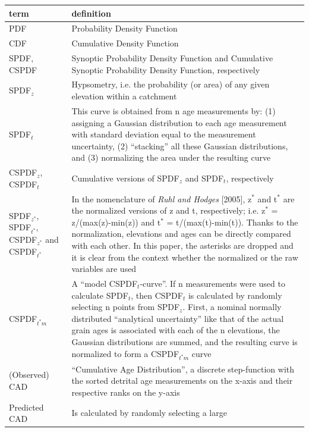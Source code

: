 \documentclass[12pt,twoside]{article}
\begin{document}
\begin{table}[here]
  \centering
\begin{footnotesize}
  \begin{tabular}[]{|p{}|p{}|}
\hline
term & definition \\
\hline\hline
PDF & Probability Density Function\\
\hline
CDF & Cumulative Density Function\\
\hline
SPDF,  CSPDF &  Synoptic   Probability  Density   Function  and
  Cumulative Synoptic Probability Density Function, respectively\\
\hline
SPDF$_{z}$ &  Hypsometry, i.e. the  probability (or area)  of any
  given elevation within a catchment\\
\hline
SPDF$_{t}$ & This curve is obtained from n age measurements by:
(1) assigning a Gaussian distribution to each age measurement with
    standard deviation equal to the measurement uncertainty,
(2) ``stacking'' all these Gaussian distributions, and
(3) normalizing the area under the resulting curve\\
\hline
CSPDF$_{z}$, CSPDF$_{t}$ &  Cumulative versions of SPDF$_{z}$ and
  SPDF$_{t}$, respectively\\
\hline
SPDF$_{z^*}$, SPDF$_{t^*}$,  CSPDF$_{z^*}$ and CSPDF$_{t^*}$ & In
  the nomenclature of {\it Ruhl and  Hodges} [2005], z$^*$ and t$^*$ are the
  normalized  versions  of  z  and  t,  respectively;  i.e.   z$^*$  =
  z/(max(z)-min(z))  and  t$^*$ =  t/(max(t)-min(t)).   Thanks to  the
  normalization,  elevations and  ages can  be directly  compared with
  each other.  In this paper, the  asterisks are
  dropped and it is clear from the context whether the normalized
  or the raw variables are used\\
\hline
CSPDF$_{t^*m}$ & A  ``model CSPDF$_t$-curve''.  If n measurements
  were used  to calculate SPDF$_t$,  then CSPDF${_t}$ is  calculated by
randomly selecting n points  from SPDF$_z$.  First, a nominal normally
distributed ``analytical  uncertainty'' like that of  the actual grain
ages  is  associated with  each  of  the  n elevations,  the  Gaussian
distributions  are summed, and  the resulting  curve is  normalized to
form a CSPDF$_{t^*m}$ curve\\
\hline
(Observed) CAD & ``Cumulative  Age Distribution'',
a discrete step-function with the sorted detrital age measurements 
on the x-axis and their respective ranks on the y-axis
\\
\hline
Predicted CAD &  Is  calculated by  randomly  selecting a  large

\end{tabular}
\end{footnotesize}
\end{table}
\end{document}

